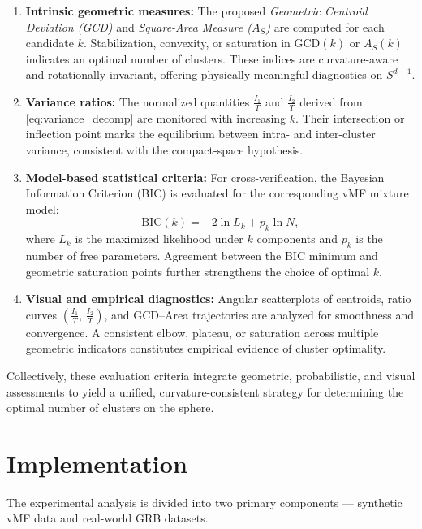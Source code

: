 \documentclass[12pt,a4paper]{report}
\begin{document}
\begin{enumerate}
    \item \textbf{Intrinsic geometric measures:}  
    The proposed \textit{Geometric Centroid Deviation (GCD)} and \textit{Square-Area Measure ($A_S$)} are computed for each candidate $k$.  
    Stabilization, convexity, or saturation in $\mathrm{GCD}(k)$ or $A_S(k)$ indicates an optimal number of clusters.  
    These indices are curvature-aware and rotationally invariant, offering physically meaningful diagnostics on $S^{d-1}$.

    \item \textbf{Variance ratios:}  
    The normalized quantities $\frac{I_1}{T}$ and $\frac{I_2}{T}$ derived from \eqref{eq:variance_decomp} are monitored with increasing $k$.  
    Their intersection or inflection point marks the equilibrium between intra- and inter-cluster variance, consistent with the compact-space hypothesis.

    \item \textbf{Model-based statistical criteria:}  
    For cross-verification, the Bayesian Information Criterion (BIC) is evaluated for the corresponding vMF mixture model:
    \begin{equation}
    \mathrm{BIC}(k) = -2\ln L_k + p_k \ln N,
    \end{equation}
    where $L_k$ is the maximized likelihood under $k$ components and $p_k$ is the number of free parameters.  
    Agreement between the BIC minimum and geometric saturation points further strengthens the choice of optimal $k$.

    \item \textbf{Visual and empirical diagnostics:}  
    Angular scatterplots of centroids, ratio curves $\left(\frac{I_1}{T},\,\frac{I_2}{T}\right)$, and GCD–Area trajectories are analyzed for smoothness and convergence.  
    A consistent elbow, plateau, or saturation across multiple geometric indicators constitutes empirical evidence of cluster optimality.
\end{enumerate}

Collectively, these evaluation criteria integrate geometric, probabilistic, and visual assessments to yield a unified, curvature-consistent strategy for determining the optimal number of clusters on the sphere.

\section{Implementation}
The experimental analysis is divided into two primary components — synthetic vMF data and real-world GRB datasets.
\end{document}
